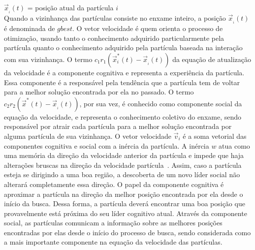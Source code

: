 ${\overrightarrow x _{_i}}\left( t \right)$ = posição atual da partícula $ i $\\
Quando a vizinhança das partículas consiste no enxame inteiro, a posição ${\overrightarrow x _{_i}}\left( t \right)$ é denominada de $ gbest $. O vetor velocidade é quem orienta o processo de otimização, usando tanto o conhecimento adquirido particularmente pela partícula quanto o conhecimento adquirido pela partícula baseada na interação com sua vizinhança. O termo $ {c_1}{r_1}\left( {\overrightarrow x _i^*\left( t \right) - {{\overrightarrow x }_{_i}}\left( t \right)} \right) $ da equação de atualização da velocidade é a componente cognitiva e representa a experiência da partícula. Essa componente é a responsável pela tendência que a partícula tem de voltar para a melhor solução encontrada por ela no passado. O termo $ {c_2}{r_2}\left( {{{\overrightarrow x }^*}\left( t \right) - {{\overrightarrow x }_{_i}}\left( t \right)} \right) $, por sua vez, é conhecido como componente social da equação da velocidade, e representa o conhecimento coletivo do enxame, sendo responsável por atrair cada partícula para a melhor solução encontrada por alguma partícula de sua vizinhança. 
O vetor velocidade $ \overrightarrow v _i $ é a soma vetorial das componentes cognitiva e social com a inércia da partícula. A inércia $ w $ atua como uma memória da direção da velocidade anterior da partícula e impede que haja alterações bruscas na direção da velocidade partícula~\cite{engelbrecht2007}. Assim, caso a partícula esteja se dirigindo a uma boa região, a descoberta de um novo líder social não alterará completamente essa direção. O papel da componente cognitiva é aproximar a partícula na direção da melhor posição encontrada por ela desde o início da busca. Dessa forma, a partícula deverá encontrar uma boa posição que provavelmente está próxima do seu líder cognitivo atual. Através da componente social, as partículas comunicam a informação sobre as melhores posições encontradas por elas desde o início do processo de busca, sendo considerada como a mais importante componente na equação da velocidade das partículas.

